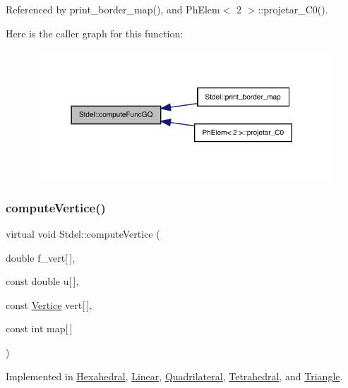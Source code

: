 Referenced by print\+\_\+border\+\_\+map(), and Ph\+Elem$<$ 2 $>$\+::projetar\+\_\+\+C0().

Here is the caller graph for this function\+:
\nopagebreak
\begin{figure}[H]
\begin{center}
\leavevmode
\includegraphics[width=314pt]{classStdel_a59195ad1ce9b90ef83fd935698dc3305_icgraph}
\end{center}
\end{figure}
\mbox{\label{classStdel_a74eed41f670878759c84e2014b4a2cd5}} 
\subsubsection{\texorpdfstring{compute\+Vertice()}{computeVertice()}}
{\footnotesize\ttfamily virtual void Stdel\+::compute\+Vertice (\begin{DoxyParamCaption}\item[{double}]{f\+\_\+vert\mbox{[}$\,$\mbox{]},  }\item[{const double}]{u\mbox{[}$\,$\mbox{]},  }\item[{const \hyperlink{structVertice}{Vertice}}]{vert\mbox{[}$\,$\mbox{]},  }\item[{const int}]{map\mbox{[}$\,$\mbox{]} }\end{DoxyParamCaption})\hspace{0.3cm}{\ttfamily [pure virtual]}}



Implemented in \hyperlink{classHexahedral_a55f51d6ec6006bde842a4f72260fbdba}{Hexahedral}, \hyperlink{classLinear_a4a1185c65f66ed46704c347af184b922}{Linear}, \hyperlink{classQuadrilateral_a8004370029320c1fee7d76dcc8c17cf8}{Quadrilateral}, \hyperlink{classTetrahedral_a0cb9858197838f9f018e41a0ccd881c5}{Tetrahedral}, and \hyperlink{classTriangle_ac75851696ddabecfc48a784cf9b3ba8a}{Triangle}.



